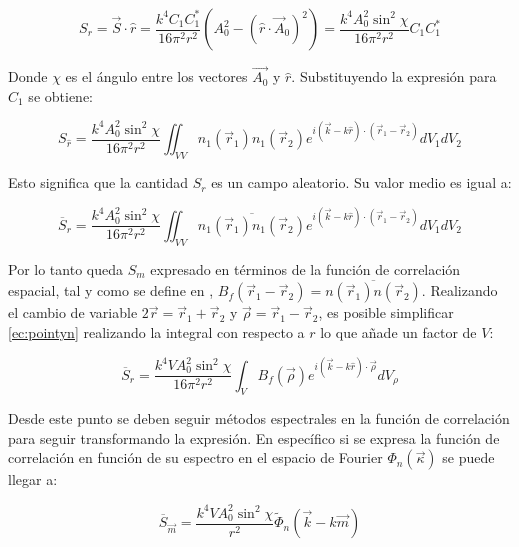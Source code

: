 \begin{equation}
    S_{r} = \vec{S} \cdot \hat{r} = \frac{k^4 C_1 C_1^*}{16\pi^2 r^2} (A_0^2 - (\hat{r} \cdot \vec{A}_0)^2) = \frac{k^4 A_0^2 \sin^2\chi}{16\pi^2 r^2} C_1 C_1^*
\end{equation}

Donde $\chi$ es el ángulo entre los vectores $\vec{A_0}$ y $\hat{r}$. Substituyendo la expresión para $C_1$ se obtiene:

\begin{equation}
    S_{\hat{r}} = \frac{k^4 A_0^2 \sin^2\chi}{16\pi^2 r^2} \iint_{V V} n_1(\vec{r}_1) n_1(\vec{r}_2) e^{i(\vec{k} - k\hat{r}) \cdot (\vec{r}_1 - \vec{r}_2)} dV_1 dV_2
\end{equation}

Esto significa que la cantidad $S_r$ es un campo aleatorio. Su valor medio es igual a:

\begin{equation}\label{ec:pointyn}
    \overline{S}_{r} = \frac{k^4 A_0^2 \sin^2\chi}{16\pi^2 r^2} \iint_{V V} \overline{n_1(\vec{r}_1) n_1(\vec{r}_2)} e^{i(\vec{k} - k\hat{r}) \cdot (\vec{r}_1 - \vec{r}_2)} dV_1 dV_2
\end{equation}

Por lo tanto queda $S_m$ expresado en términos de la función de correlación espacial, tal y como se define en \cite{tatarski_wave_1967}, $B_f(\vec{r}_1 - \vec{r}_2) = \overline{n(\vec{r}_1)n(\vec{r}_2)}$. Realizando el cambio de variable $2\vec{r} = \vec{r}_1 + \vec{r}_2$ y $\vec{\rho} = \vec{r}_1 - \vec{r}_2$, es posible simplificar \ref{ec:pointyn} realizando la integral con respecto a $r$ lo que añade un factor de $V$:

\begin{equation}\label{ec:pointyn_2}
    \overline{S}_{r} = \frac{k^4 VA_0^2 \sin^2\chi }{16\pi^2 r^2}\int_V B_f(\vec{\rho}) e^{i(\vec{k} - k\hat{r}) \cdot \vec{\rho}} dV_\rho
\end{equation}

Desde este punto se deben seguir métodos espectrales en la función de correlación para seguir transformando la expresión. En específico si se expresa la función de correlación en función de su espectro en el espacio de Fourier $\Phi_n(\vec\kappa)$ se puede llegar a:

\begin{equation}
    \overline{S}_{\vec{m}} = \frac{k^4 V A_0^2 \sin^2\chi}{r^2} \tilde{\Phi}_n(\vec{k} - k\vec{m})
\end{equation}

